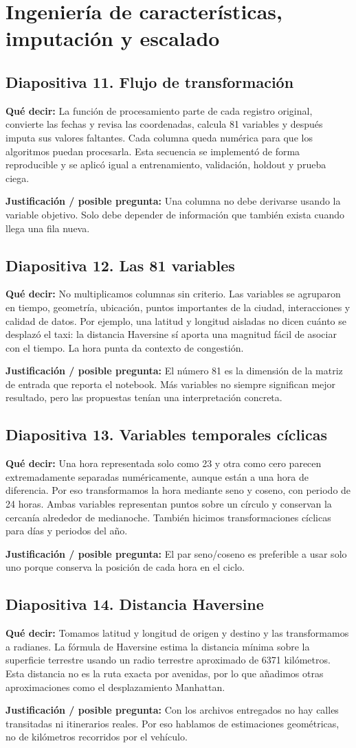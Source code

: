 \documentclass[11pt,letterpaper]{article}
\newcommand{\lamina}[2]{\subsection*{Diapositiva #1. #2}}
\newcommand{\explica}[1]{\noindent\textcolor{azul}{\textbf{Qué decir:}} #1\par\smallskip}
\newcommand{\defiende}[1]{\noindent\textcolor{verde}{\textbf{Justificación / posible pregunta:}} #1\par\medskip}
\begin{document}
\section{Ingeniería de características, imputación y escalado}
\lamina{11}{Flujo de transformación}
\explica{La función de procesamiento parte de cada registro original, convierte las fechas y revisa las coordenadas, calcula 81 variables y después imputa sus valores faltantes. Cada columna queda numérica para que los algoritmos puedan procesarla. Esta secuencia se implementó de forma reproducible y se aplicó igual a entrenamiento, validación, holdout y prueba ciega.}
\defiende{Una columna no debe derivarse usando la variable objetivo. Solo debe depender de información que también exista cuando llega una fila nueva.}

\lamina{12}{Las 81 variables}
\explica{No multiplicamos columnas sin criterio. Las variables se agruparon en tiempo, geometría, ubicación, puntos importantes de la ciudad, interacciones y calidad de datos. Por ejemplo, una latitud y longitud aisladas no dicen cuánto se desplazó el taxi: la distancia Haversine sí aporta una magnitud fácil de asociar con el tiempo. La hora punta da contexto de congestión.}
\defiende{El número 81 es la dimensión de la matriz de entrada que reporta el notebook. Más variables no siempre significan mejor resultado, pero las propuestas tenían una interpretación concreta.}

\lamina{13}{Variables temporales cíclicas}
\explica{Una hora representada solo como 23 y otra como cero parecen extremadamente separadas numéricamente, aunque están a una hora de diferencia. Por eso transformamos la hora mediante seno y coseno, con periodo de 24 horas. Ambas variables representan puntos sobre un círculo y conservan la cercanía alrededor de medianoche. También hicimos transformaciones cíclicas para días y periodos del año.}
\defiende{El par seno/coseno es preferible a usar solo uno porque conserva la posición de cada hora en el ciclo.}

\lamina{14}{Distancia Haversine}
\explica{Tomamos latitud y longitud de origen y destino y las transformamos a radianes. La fórmula de Haversine estima la distancia mínima sobre la superficie terrestre usando un radio terrestre aproximado de 6371 kilómetros. Esta distancia no es la ruta exacta por avenidas, por lo que añadimos otras aproximaciones como el desplazamiento Manhattan.}
\defiende{Con los archivos entregados no hay calles transitadas ni itinerarios reales. Por eso hablamos de estimaciones geométricas, no de kilómetros recorridos por el vehículo.}
\end{document}

